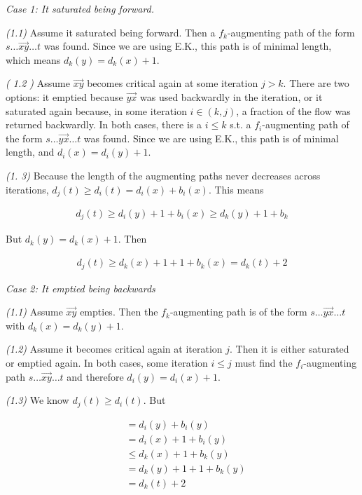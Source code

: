 \documentclass[a4paper, 12pt]{article}
\begin{document}
\textit{Case 1: It saturated being forward.}

\textit{(1.1)} Assume it saturated being forward. Then a $f_k$-augmenting path of
the form $s \ldots \overrightarrow{xy} \ldots t$ was found. Since we are using
E.K., this path is of minimal length, which means $d_k(y) = d_k(x) + 1$.

\textit{( 1.2 )} Assume $\overrightarrow{xy}$ becomes critical again 
at some iteration $j > k$. There are two options: it emptied because 
$\overrightarrow{yx}$ was used backwardly in the iteration, or it 
saturated again because, in some iteration $i \in (k, j)$, a fraction
of the flow was returned backwardly. In both cases, there is a $i \leq k$ s.t.
a $f_i$-augmenting path of the form $s \ldots \overrightarrow{yx} \ldots t$ was
found. Since we are using E.K., this path is of minimal length, 
and $d_i(x) = d_i(y) + 1$.

\textit{(1. 3)} Because the length of the augmenting paths 
never decreases across iterations, $d_j(t) \geq d_i(t) = d_i(x) + b_i(x)$.
This means 

    \begin{align*}
        d_j(t) \geq d_i(y) + 1 + b_i(x) \geq d_k(y) + 1 + b_k
    \end{align*}

But $d_k(y) = d_k(x) + 1$. Then

    \begin{align*}
        d_j(t) \geq d_k(x) + 1 + 1 + b_k(x) = d_k(t) + 2
    \end{align*}

\textit{Case 2: It emptied being backwards}

\textit{(1.1)} Assume $\overrightarrow{xy}$ empties. Then the $f_k$-augmenting 
path is of the form $s \ldots \overrightarrow{yx} \ldots t$ with 
$d_k(x) = d_k(y) + 1$.

\textit{(1.2)} Assume it becomes critical again at iteration $j$.
Then it is either saturated or emptied again. In both cases, 
some iteration $i \leq j$ must find the $f_i$-augmenting path 
$s \ldots \overrightarrow{xy} \ldots t$ and therefore 
$d_i(y) = d_i(x) + 1$. 

\textit{(1.3)} We know $d_j(t) \geq d_i(t)$. But

    \begin{align*}
               &=d_i(y) + b_i(y) \\ 
               &= d_i(x) + 1 + b_i(y) \\ 
               &\leq d_k(x) + 1 + b_k(y) \\ 
               &= d_k(y) + 1 + 1 + b_k(y) \\ 
               &=d_k(t) + 2
    \end{align*}
\end{document}
